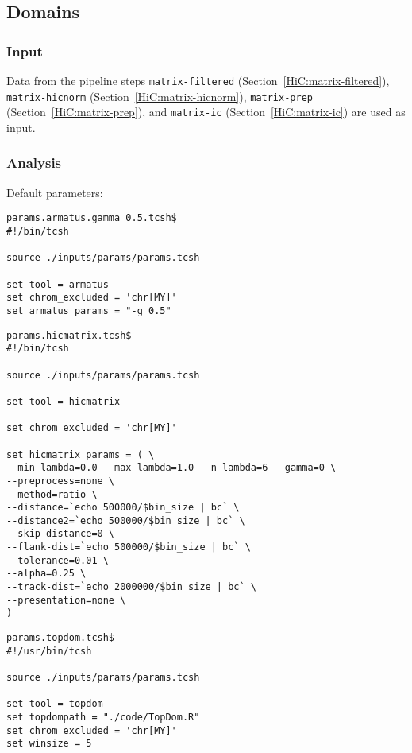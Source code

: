 \subsection{Domains}\label{HiC:domains}%
\subsubsection{Input} %
Data from the pipeline steps %
\texttt{matrix-filtered} (Section~\ref{HiC:matrix-filtered}), \texttt{matrix-hicnorm} (Section~\ref{HiC:matrix-hicnorm}), \texttt{matrix-prep} (Section~\ref{HiC:matrix-prep}), and \texttt{matrix-ic} (Section~\ref{HiC:matrix-ic}) are used as input.
\subsubsection{Analysis} %
Default parameters:
\begin{lstlisting}
params.armatus.gamma_0.5.tcsh$
#!/bin/tcsh

source ./inputs/params/params.tcsh

set tool = armatus
set chrom_excluded = 'chr[MY]'
set armatus_params = "-g 0.5"
\end{lstlisting}

\begin{lstlisting}
params.hicmatrix.tcsh$
#!/bin/tcsh

source ./inputs/params/params.tcsh

set tool = hicmatrix

set chrom_excluded = 'chr[MY]'

set hicmatrix_params = ( \
--min-lambda=0.0 --max-lambda=1.0 --n-lambda=6 --gamma=0 \
--preprocess=none \
--method=ratio \
--distance=`echo 500000/$bin_size | bc` \
--distance2=`echo 500000/$bin_size | bc` \
--skip-distance=0 \
--flank-dist=`echo 500000/$bin_size | bc` \
--tolerance=0.01 \
--alpha=0.25 \
--track-dist=`echo 2000000/$bin_size | bc` \
--presentation=none \
)
\end{lstlisting}

\begin{lstlisting}
params.topdom.tcsh$
#!/usr/bin/tcsh

source ./inputs/params/params.tcsh

set tool = topdom
set topdompath = "./code/TopDom.R"
set chrom_excluded = 'chr[MY]'
set winsize = 5
\end{lstlisting}
